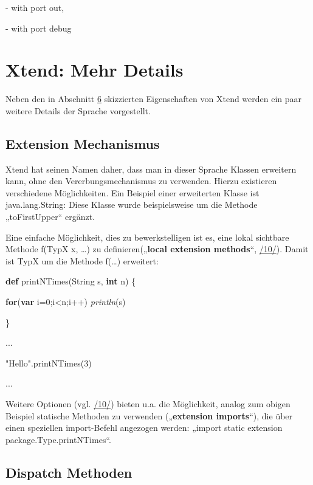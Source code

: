 \documentclass[]{article}
\begin{document}
- with port out,

- with port debug

\section[Xtend: Mehr
Details]{\texorpdfstring{\protect\hypertarget{anchor-36}{}{}Xtend: Mehr
Details}{Xtend: Mehr Details}}\label{xtend-mehr-details}

Neben den in Abschnitt \protect\hyperlink{anchor-33}{6} skizzierten
Eigenschaften von Xtend werden ein paar weitere Details der Sprache
vorgestellt.

\subsection[Extension
Mechanismus]{\texorpdfstring{\protect\hypertarget{anchor-37}{}{}Extension
Mechanismus}{Extension Mechanismus}}\label{extension-mechanismus}

Xtend hat seinen Namen daher, dass man in dieser Sprache Klassen
erweitern kann, ohne den Vererbungsmechanismus zu verwenden. Hierzu
existieren verschiedene Möglichkeiten. Ein Beispiel einer erweiterten
Klasse ist java.lang.String: Diese Klasse wurde beispielsweise um die
Methode „toFirstUpper`` ergänzt.

Eine einfache Möglichkeit, dies zu bewerkstelligen ist es, eine lokal
sichtbare Methode f(TypX x, \ldots{}) zu definieren(„\textbf{local
extension methods}``, \protect\hyperlink{anchor-12}{/10/}). Damit ist
TypX um die Methode f(\ldots{}) erweitert:

\textbf{def} printNTimes(String s, \textbf{int} n) \{

\textbf{for}(\textbf{var} i=0;i\textless{}n;i++) \emph{println}(s)

\}

...

"Hello".printNTimes(3)

...

Weitere Optionen (vgl. \protect\hyperlink{anchor-12}{/10/}) bieten u.a.
die Möglichkeit, analog zum obigen Beispiel statische Methoden zu
verwenden („\textbf{extension imports}``), die über einen speziellen
import-Befehl angezogen werden: „import static extension
package.Type.printNTimes``.

\subsection[Dispatch
Methoden]{\texorpdfstring{\protect\hypertarget{anchor-38}{}{}\protect\hypertarget{anchor-39}{}{}Dispatch
Methoden}{Dispatch Methoden}}\label{dispatch-methoden}
\end{document}
